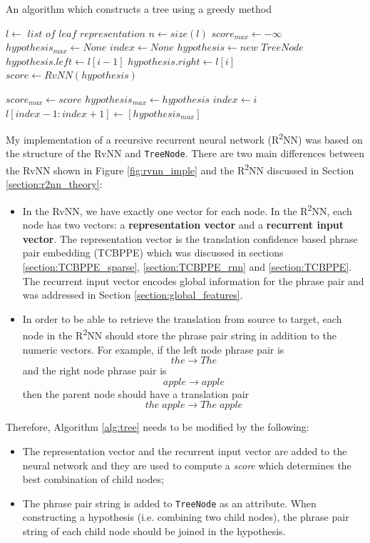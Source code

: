 \documentclass[12pt,a4paper,twoside]{report}
\begin{document}
\begin{algorithm}
\caption{An algorithm which constructs a tree using a greedy method}\label{alg:tree}
\begin{algorithmic}
\State $l \gets$ $list$ $of$ $leaf$ $representation$
\State $n \gets size(l)$
    \State $score_{max}\gets -\infty$
    \State $hypothesis_{max}\gets None$
    \State $index\gets None$
        \State $hypothesis\gets new$ $TreeNode$
        \State $hypothesis.left\gets l[i-1]$
        \State $hypothesis.right\gets l[i]$
        \State $score\gets RvNN(hypothesis)$

            \State $score_{max}\gets score$
            \State $hypothesis_{max}\gets hypothesis$
            \State $index\gets i$
        \EndIf
    \EndFor
    \State $l[index-1:index+1]\gets [hypothesis_{max}]$
\EndWhile
\end{algorithmic}
\end{algorithm}

My implementation of a recursive recurrent neural network (R\textsuperscript{2}NN) was based on the structure of the RvNN and \texttt{TreeNode}. There are two main differences between the RvNN shown in Figure \ref{fig:rvnn_imple} and the R\textsuperscript{2}NN discussed in Section \ref{section:r2nn_theory}:

\begin{itemize}
    \item In the RvNN, we have exactly one vector for each node. In the R\textsuperscript{2}NN, each node has two vectors: a \textbf{representation vector} and a \textbf{recurrent input vector}. The representation vector is the translation confidence based phrase pair embedding (TCBPPE) which was discussed in sections \ref{section:TCBPPE_sparse}, \ref{section:TCBPPE_rnn} and \ref{section:TCBPPE}. The recurrent input vector encodes global information for the phrase pair and was addressed in Section \ref{section:global_features}.
    \item In order to be able to retrieve the translation from source to target, each node in the R\textsuperscript{2}NN should store the phrase pair string in addition to the numeric vectors. For example, if the left node phrase pair is \[the\rightarrow The\] and the right node phrase pair is \[apple\rightarrow apple\] then the parent node should have a translation pair \[the\;apple \rightarrow The\;apple\]
\end{itemize}

Therefore, Algorithm \ref{alg:tree} needs to be modified by the following:
\begin{itemize}
    \item The representation vector and the recurrent input vector are added to the neural network and they are used to compute a \textit{score} which determines the best combination of child nodes;
    \item The phrase pair string is added to \texttt{TreeNode} as an attribute. When constructing a hypothesis (i.e. combining two child nodes), the phrase pair string of each child node should be joined in the hypothesis.
\end{itemize}
\end{document}

